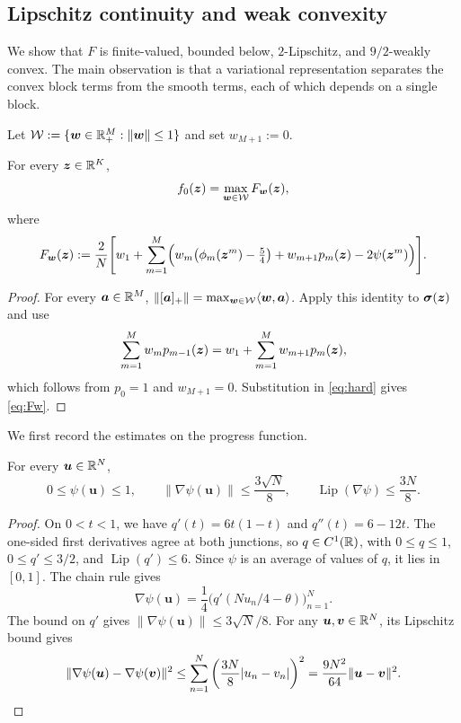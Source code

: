 \subsection{Lipschitz continuity and weak convexity}
\label{subsec:regularity}
We show that $F$ is finite-valued, bounded below, $2$-Lipschitz,
and $9/2$-weakly convex. The main observation is that a variational
representation separates the convex block terms from the smooth
terms, each of which depends on a single block.

Let $\mathcal W:=\{\bm w\in{\mathbb{R}}_+^M:\|\bm w\|\le1\}$ and set
$w_{M+1}:=0$.
\begin{lemma}
\label{lem:max-representation}
For every $\bm{z}\in{\mathbb{R}}^K$,
\[
 f_0(\bm{z})=\max_{\bm w\in\mathcal W}F_{\bm w}(\bm{z}),
\]
where
\begin{equation}
 F_{\bm w}(\bm{z}):=\frac2N\Biggl[
 w_1+\sum_{m=1}^M\Bigl(
 w_m\bigl(\phi_m(\bm{z}^m)-\tfrac54\bigr)
 +w_{m+1}p_m(\bm{z})-2\psi(\bm{z}^m)\Bigr)\Biggr].
 \label{eq:Fw}
\end{equation}
\end{lemma}
\begin{proof}
For every $\bm{a}\in{\mathbb{R}}^M$,
$\|[\bm{a}]_+\|=\max_{\bm w\in\mathcal W}\langle\bm w,\bm{a}\rangle$.
Apply this identity to $\boldsymbol\sigma(\bm{z})$ and use
\[
 \sum_{m=1}^M w_mp_{m-1}(\bm{z})
 =w_1+\sum_{m=1}^M w_{m+1}p_m(\bm{z}),
\]
which follows from $p_0=1$ and $w_{M+1}=0$.
Substitution in \eqref{eq:hard} gives \eqref{eq:Fw}.
\end{proof}

We first record the estimates on the progress function.
\begin{lemma}
\label{lem:progress-regularity}
For every $\bm u\in{\mathbb{R}}^N$,
\[
 0\le\psi(\bm u)\le1,\qquad
 \|\nabla\psi(\bm u)\|\le\frac{3\sqrt N}{8},\qquad
 \operatorname{Lip}(\nabla\psi)\le\frac{3N}{8}.
\]
\end{lemma}
\begin{proof}
On $0<t<1$, we have $q'(t)=6t(1-t)$ and $q''(t)=6-12t$.
The one-sided first derivatives agree at both junctions, so
$q\in C^1({\mathbb{R}})$, with
$0\le q\le1$, $0\le q'\le3/2$, and
$\operatorname{Lip}(q')\le6$.
Since $\psi$ is an average of values of $q$, it lies in $[0,1]$.
The chain rule gives
\[
 \nabla\psi(\bm u)
 =\frac14\bigl(q'(Nu_n/4-\theta)\bigr)_{n=1}^N.
\]
The bound on $q'$ gives $\|\nabla\psi(\bm u)\|\le3\sqrt N/8$.
For any $\bm u,\bm v\in{\mathbb{R}}^N$, its Lipschitz bound gives
\[
 \|\nabla\psi(\bm u)-\nabla\psi(\bm v)\|^2
 \le\sum_{n=1}^N\left(\frac{3N}{8}|u_n-v_n|\right)^2
 =\frac{9N^2}{64}\|\bm u-\bm v\|^2.\qedhere
\]
\end{proof}

